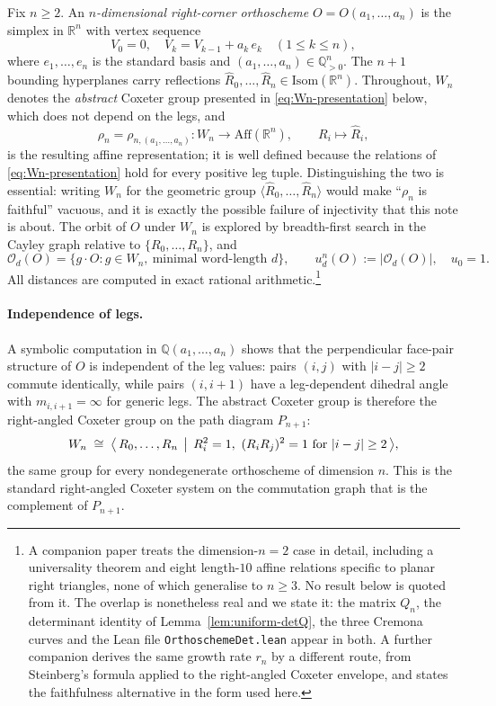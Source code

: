 \documentclass[11pt,a4paper]{article}
\theoremstyle{remark}
\theoremstyle{plain}
\begin{document}
Fix $n \ge 2$.  An \emph{$n$-dimensional right-corner orthoscheme}
$O = O(a_1, \ldots, a_n)$ is the simplex in $\mathbb{R}^n$ with
vertex sequence
\[
V_0 = 0, \quad V_k = V_{k-1} + a_k\, e_k \quad (1 \le k \le n),
\]
where $e_1, \ldots, e_n$ is the standard basis and
$(a_1, \ldots, a_n) \in \mathbb{Q}_{>0}^n$.  The $n+1$ bounding hyperplanes carry reflections
$\widehat R_0, \ldots, \widehat R_n \in \mathrm{Isom}(\mathbb{R}^n)$. Throughout,
$W_n$ denotes the \emph{abstract} Coxeter group presented in
\eqref{eq:Wn-presentation} below, which does not depend on the legs, and
\[
  \rho_n = \rho_{n,(a_1,\ldots,a_n)} : W_n \longrightarrow \mathrm{Aff}(\mathbb{R}^n),
  \qquad R_i \longmapsto \widehat R_i ,
\]
is the resulting affine representation; it is well defined because the relations
of \eqref{eq:Wn-presentation} hold for every positive leg tuple. Distinguishing
the two is essential: writing $W_n$ for the geometric group
$\langle \widehat R_0, \ldots, \widehat R_n\rangle$ would make ``$\rho_n$ is
faithful'' vacuous, and it is exactly the possible failure of injectivity that
this note is about.
The orbit of $O$ under $W_n$ is explored by breadth-first search in
the Cayley graph relative to $\{R_0, \ldots, R_n\}$, and
\[
\mathcal{O}_d(O) = \{ g \cdot O : g \in W_n,\ \text{minimal word-length } d\},
\qquad u_d^n(O) := |\mathcal{O}_d(O)|, \quad u_0 = 1.
\]
All distances are computed in exact rational arithmetic.\footnote{%
A companion paper treats the dimension-$n=2$ case in detail,
including a universality theorem and eight length-$10$ affine
relations specific to planar right triangles, none of which
generalise to $n \ge 3$. No result below is quoted from it. The overlap is
nonetheless real and we state it: the matrix $Q_n$, the determinant identity of
Lemma~\ref{lem:uniform-detQ}, the three Cremona curves and the Lean file
\texttt{OrthoschemeDet.lean} appear in both. A further companion derives the
same growth rate $r_n$ by a different route, from Steinberg's formula applied to
the right-angled Coxeter envelope, and states the faithfulness alternative in
the form used here.}

\paragraph{Independence of legs.}  A symbolic computation in
$\mathbb{Q}(a_1, \ldots, a_n)$ shows that the perpendicular face-pair
structure of $O$ is independent of the leg values: pairs $(i, j)$
with $|i - j| \ge 2$ commute identically, while pairs $(i, i+1)$
have a leg-dependent dihedral angle with $m_{i,i+1} = \infty$ for
generic legs.  The abstract Coxeter group is therefore the
right-angled Coxeter group on the path diagram $P_{n+1}$:
\begin{equation}\label{eq:Wn-presentation}
W_n  \;\cong\;  \bigl\langle\, R_0, \ldots, R_n \,\bigm|\, R_i^2 = 1,\
(R_i R_j)^2 = 1 \text{ for } |i - j| \ge 2 \,\bigr\rangle,
\end{equation}
the same group for every nondegenerate orthoscheme of dimension $n$.
This is the standard right-angled Coxeter system on the commutation
graph that is the complement of $P_{n+1}$.
\end{document}
